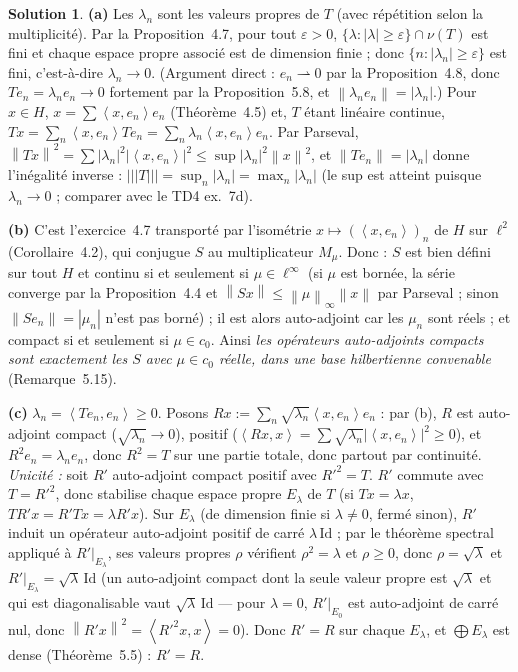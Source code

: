 \documentclass[11pt,a4paper]{article}
\newcommand{\norm}[1]{\left\|#1\right\|}
\newcommand{\opnorm}[1]{|\!|\!|#1|\!|\!|}
\newcommand{\ie}{c'est-à-dire}
\newcommand{\ps}[2]{\left\langle #1,#2\right\rangle}
\theoremstyle{definition}
\newtheorem*{solution}{Solution}
\begin{document}
\begin{solution}
\noindent\textbf{(a)} Les $\lambda_n$ sont les valeurs propres de $T$ (avec répétition selon la multiplicité). Par la Proposition~4.7, pour tout $\varepsilon>0$, $\{\lambda:|\lambda|\ge\varepsilon\}\cap\nu(T)$ est fini et chaque espace propre associé est de dimension finie ; donc $\{n:|\lambda_n|\ge\varepsilon\}$ est fini, \ie{} $\lambda_n\to0$. (Argument direct : $e_n\rightharpoonup0$ par la Proposition~4.8, donc $Te_n=\lambda_ne_n\to0$ fortement par la Proposition~5.8, et $\norm{\lambda_ne_n}=|\lambda_n|$.) Pour $x\in H$, $x=\sum\ps x{e_n}e_n$ (Théorème~4.5) et, $T$ étant linéaire continue, $Tx=\sum_n\ps x{e_n}Te_n=\sum_n\lambda_n\ps x{e_n}e_n$. Par Parseval, $\norm{Tx}^2=\sum|\lambda_n|^2|\ps x{e_n}|^2\le\sup|\lambda_n|^2\norm x^2$, et $\norm{Te_n}=|\lambda_n|$ donne l'inégalité inverse : $\opnorm T=\sup_n|\lambda_n|=\max_n|\lambda_n|$ (le sup est atteint puisque $\lambda_n\to0$ ; comparer avec le TD4 ex.~7d).

\medskip
\noindent\textbf{(b)} C'est l'exercice~4.7 transporté par l'isométrie $x\mapsto(\ps x{e_n})_n$ de $H$ sur $\ell^2$ (Corollaire~4.2), qui conjugue $S$ au multiplicateur $M_\mu$. Donc : $S$ est bien défini sur tout $H$ et continu si et seulement si $\mu\in\ell^\infty$ (si $\mu$ est bornée, la série converge par la Proposition~4.4 et $\norm{Sx}\le\norm\mu_\infty\norm x$ par Parseval ; sinon $\norm{Se_n}=|\mu_n|$ n'est pas borné) ; il est alors auto-adjoint car les $\mu_n$ sont réels ; et compact si et seulement si $\mu\in c_0$. Ainsi \emph{les opérateurs auto-adjoints compacts sont exactement les $S$ avec $\mu\in c_0$ réelle, dans une base hilbertienne convenable} (Remarque~5.15).

\medskip
\noindent\textbf{(c)} $\lambda_n=\ps{Te_n}{e_n}\ge0$. Posons $Rx:=\sum_n\sqrt{\lambda_n}\ps x{e_n}e_n$ : par (b), $R$ est auto-adjoint compact ($\sqrt{\lambda_n}\to0$), positif ($\ps{Rx}x=\sum\sqrt{\lambda_n}|\ps x{e_n}|^2\ge0$), et $R^2e_n=\lambda_ne_n$, donc $R^2=T$ sur une partie totale, donc partout par continuité. \emph{Unicité :} soit $R'$ auto-adjoint compact positif avec $R'^2=T$. $R'$ commute avec $T=R'^2$, donc stabilise chaque espace propre $E_\lambda$ de $T$ (si $Tx=\lambda x$, $TR'x=R'Tx=\lambda R'x$). Sur $E_\lambda$ (de dimension finie si $\lambda\ne0$, fermé sinon), $R'$ induit un opérateur auto-adjoint positif de carré $\lambda\,\mathrm{Id}$ ; par le théorème spectral appliqué à $R'|_{E_\lambda}$, ses valeurs propres $\rho$ vérifient $\rho^2=\lambda$ et $\rho\ge0$, donc $\rho=\sqrt\lambda$ et $R'|_{E_\lambda}=\sqrt\lambda\,\mathrm{Id}$ (un auto-adjoint compact dont la seule valeur propre est $\sqrt\lambda$ et qui est diagonalisable vaut $\sqrt\lambda\,\mathrm{Id}$ — pour $\lambda=0$, $R'|_{E_0}$ est auto-adjoint de carré nul, donc $\norm{R'x}^2=\ps{R'^2x}x=0$). Donc $R'=R$ sur chaque $E_\lambda$, et $\bigoplus E_\lambda$ est dense (Théorème~5.5) : $R'=R$.


\end{solution}
\end{document}
